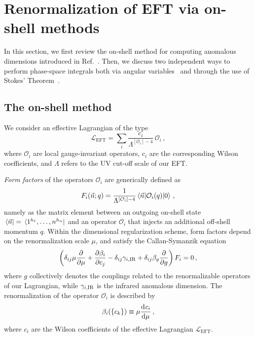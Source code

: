 \section{\label{sec:method}
Renormalization of EFT via on-shell methods}

In this section, we first review the on-shell method for computing anomalous dimensions introduced in Ref.~\cite{Caron-Huot:2016cwu}. Then, we discuss two independent ways to perform 
phase-space integrals both via angular variables~\cite{Zwiebel:2011bx} and through the use of Stokes' 
Theorem~\cite{Mastrolia:2009dr}. 
%

\subsection{The on-shell method}
%
We consider an effective Lagrangian of the type
\begin{equation}
\mathcal L_{\text{EFT}} = \sum_i 
\frac{c_i}{\Lambda^{[\mathcal O_i]-4}} \,\mathcal O_i \, , 
\end{equation}
%
where $\mathcal{O}_i$ are local gauge-invariant operators, $c_i$ are the corresponding Wilson coefficients, and $\Lambda$ refers to the UV cut-off scale of our EFT.

{\it Form factors} of the operators $\mathcal{O}_i$ are generically defined as
%
\begin{equation}
    F_i(\vec n;q)= \frac{1}{\Lambda^{[\mathcal O_i]-4}}\mel*{\vec n}{\mathcal O_i(q)}{0}\,,
\end{equation}
%
namely as the matrix element between an outgoing on-shell state $\bra*{\vec n}=\bra*{1^{h_1},\dotsc,n^{h_n}}$ and an operator $\mathcal O_i$ that injects an additional off-shell momentum $q$.
Within the dimensional regularization scheme, form factors depend on the renormalization scale $\mu$, and satisfy the Callan-Symanzik equation
%
\begin{equation}
\label{eq:CSEq}
    \left(\delta_{ij} \mu\frac{\partial}{\partial \mu}+ \frac{\partial \beta_i}{\partial c_j}-\delta_{ij}\gamma_{i,\textup{IR}} +\delta_{ij}\beta_g\frac{\partial}{\partial g}\right)F_i=   0\,,
\end{equation}
%
where $g$ collectively denotes the couplings related to the renormalizable operators of our Lagrangian, while $\gamma_{i,\textup{IR}}$ is the infrared anomalous dimension. 
The renormalization of the operator $\mathcal{O}_i$ 
is described by
%
\begin{equation}
\beta_i(\{c_k\}) \equiv \mu \dv[]{c_i}{\mu} \,, 
\end{equation}
%
where $c_i$ are the Wilson coefficients of the effective Lagrangian $\mathcal{L}_{\text{EFT}}$.

